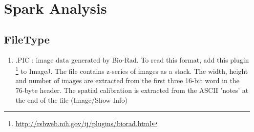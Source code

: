 \chapter{Spark Analysis}

\section{FileType}

\begin{enumerate}
  \item .PIC : image data generated by Bio-Rad. To read this format, add this
  plugin \footnote{\url{http://rsbweb.nih.gov/ij/plugins/biorad.html}} to
  ImageJ. The file contains z-series of images as a stack. The width, height and
  number of images are extracted from the first three 16-bit word in the 76-byte
  header. The spatial calibration is extracted from the ASCII 'notes' at the end
  of the file (Image/Show Info)
\end{enumerate}